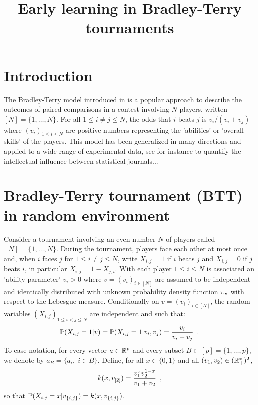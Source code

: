 


\title{Early learning in Bradley-Terry tournaments}
\date{}

\author{}

\lhead{}

\maketitle

\begin{abstract}

\end{abstract}

\section{Introduction}
The Bradley-Terry model introduced in \cite{bradley:terry:1952,zemerlo:1929} is a popular approach to describe the outcomes of paired comparisons in a contest involving $N$ players, written $[N]=\{1,\ldots,N\}$. For all $1\le i \ne j\le N$, the odds that $i$ beats $j$ is $v_i/(v_i+v_j)$ where $(v_i)_{1\le i\le N}$ are positive numbers representing the 'abilities' or 'overall skills' of  the players. This model has been generalized in many directions and applied to a wide range of experimental data, see for instance \cite{stigler:1994} to quantify the intellectual influence between statistical journals...
\cite{hastie:tibshirani:1998}
\cite{hunter:2004}
\section{Bradley-Terry tournament (BTT) in random environment}
Consider a tournament involving an even number $N$ of players called $[N]=\{1,\ldots,N\}$. 
During the tournament, players face each other at most once and, when $i$ faces $j$ for $1\le i \neq j\le N$, write $X_{i,j}=1$ if $i$ beats $j$ and $X_{i,j}=0$ if $j$ beats $i$, in particular $X_{i,j}=1-X_{j,i}$. With each player $1\le i\le N$ is associated an 'ability parameter' $v_i>0$ where $v=(v_i)_{i\in[N]}$ are assumed to be independent and identically distributed with unknown probability density function $\pi_{\star}$ with respect to the Lebesgue measure. Conditionally on $v=(v_i)_{i\in[N]}$, the random variables $(X_{i,j})_{1\le i<j\le N}$ are independent and such that:
\[
\mathbb{P}(X_{i,j}=1|v) = \mathbb{P}(X_{i,j}=1|v_i,v_j)=\frac{v_i}{v_i+v_j}\enspace.
\]
To ease notation, for every vector $a\in \mathbb{R}^p$ and every subset $B\subset [p]=\{1,\ldots,p\}$, we denote by $a_{B}=\{a_i,\;i\in B\}$. Define, for all $x\in \{0,1\}$ and all $(v_1,v_2)\in(\mathbb{R}_+^*)^2$, 
\begin{equation}
\label{eq:def:condlik}
k(x,v_{[2]})=\frac{v_1^xv_2^{1-x}}{v_1+v_2}\enspace,
\end{equation}
so that $\mathbb{P}(X_{i,j}=x|v_{\{i,j\}})=k(x,v_{\{i,j\}})$. 



